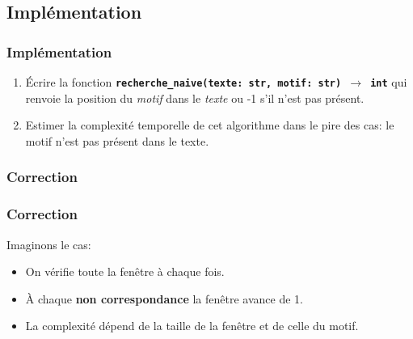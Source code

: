 \documentclass[svgnames,11pt]{beamer}
\begin{document}
\subsection{Implémentation}
\begin{frame}
    \frametitle{Implémentation}

    \begin{activite}
        \begin{enumerate}
            \item Écrire la fonction \textbf{\texttt{recherche\_naive(texte: str, motif: str) $\rightarrow$ int}} qui renvoie la position du \emph{motif} dans le \emph{texte} ou -1 s'il n'est pas présent.
            \item Estimer la complexité temporelle de cet algorithme dans le pire des cas: le motif n'est pas présent dans le texte.
        \end{enumerate}
    \end{activite}

\end{frame}
\begin{frame}
    \frametitle{Correction}

\begin{center}

\label{CODE}
\end{center}

\end{frame}

\begin{frame}
    \frametitle{Correction}
Imaginons le cas: 
    \begin{center}
    \end{center}
\begin{itemize}
    \item On vérifie toute la fenêtre à chaque fois.
    \item À chaque \textbf{non correspondance} la fenêtre avance de 1. 
    \item La complexité dépend de la taille de la fenêtre et de celle du motif.
\end{itemize}
\end{frame}
\end{document}
